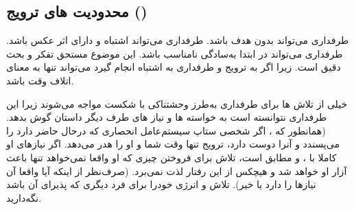 \subsection{محدودیت های ترویج ()}

طرفداری می‌تواند بدون هدف باشد. طرفداری می‌تواند اشتباه و دارای اثر عکس باشد.
طرفداری می‌تواند در ابتدا به‌سادگی نامناسب باشد. این موضوع مستحق تفکر و بحث دقیق است.
زیرا اگر به ترویج و طرفداری به اشتباه انجام گیرد می‌تواند تنها به معنای اتلاف وقت باشد.

خیلی از تلاش ها برای طرفداری به‌طرز وحشتناکی با شکست مواجه می‌شوند
زیرا این طرفداری نتوانسته است به خواسته ها و نیاز های طرف دیگر داستان
گوش بدهد. (همانطور که 
،
اگر شخصی ستاپ سیستم‌عامل انحصاری که درحال حاضر دارد را می‌پسندد
و آنرا دوست دارد، ترویج تنها وقت شما و او را هدر می‌دهد.
اگر نیازهای او کاملا با ،  و
مطابق است، تلاش برای فروختن چیزی که او واقعا نمی‌خواهد 
تنها باعث آزار او خواهد شد و هیچکس از این رفتار لذت نمی‌برد.
(صرف‌نظر از اینکه آیا واقعا آن نیازها را دارد یا خیر).
تلاش و انرژی خودرا برای فرد دیگری که پذیرای آن باشد نگه‌‌دارید.

